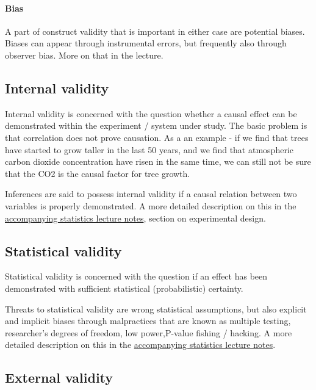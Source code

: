 \documentclass{tufte-book}
\begin{document}
\paragraph{Bias} A part of construct validity that is important in either case are potential biases. Biases can appear through instrumental errors, but frequently also through observer bias. More on that in the lecture. 


\subsection{Internal validity}

Internal validity is concerned with the question whether a causal effect can be demonstrated within the experiment / system under study. The basic problem is that correlation does not prove causation. As a an example - if we find that trees have started to grow taller in the last 50 years, and we find that atmospheric carbon dioxide concentration have risen in the same time, we can still not be sure that the CO2 is the causal factor for tree growth. 

Inferences are said to possess internal validity if a causal relation between two variables is properly demonstrated. A more detailed description on this in the \href{https://florianhartig.github.io/Statistics/}{accompanying statistics lecture notes}, section on experimental design.


\subsection{Statistical validity}

Statistical validity is concerned with the question if an effect has been demonstrated with sufficient statistical (probabilistic) certainty. 

Threats to statistical validity are wrong statistical assumptions, but also explicit and implicit biases through malpractices that are known as multiple testing, researcher’s degrees of freedom, low power,P-value fishing / hacking. A more detailed description on this in the \href{https://florianhartig.github.io/Statistics/}{accompanying statistics lecture notes}. 

\subsection{External validity}
\end{document}
